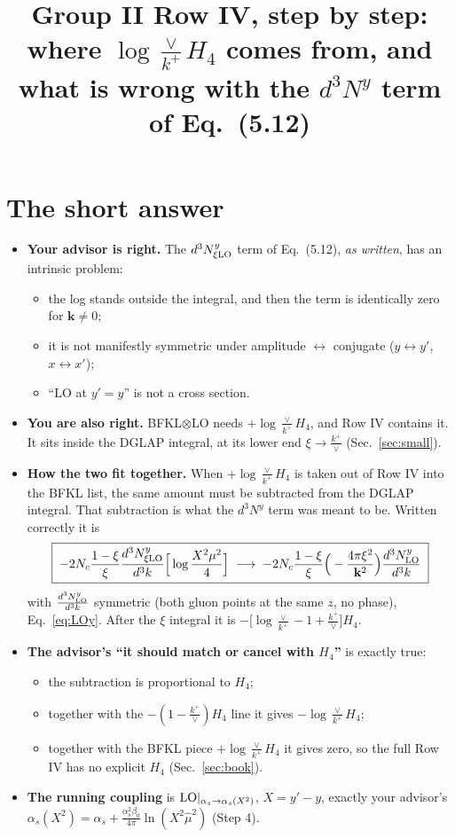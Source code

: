 \documentclass[10pt]{article}
\title{Group II Row IV, step by step:\\ where $\log\frac{\vee}{k^+}H_4$ comes from, and what is wrong with the $d^3N^y$ term of Eq.~(5.12)}
\date{}
\numberwithin{equation}{section}
\newcommand{\LO}{{\rm LO}}
\begin{document}
\maketitle

\section{The short answer}
\begin{itemize}
\item \textbf{Your advisor is right.} The $d^3N^y_{\xi\rm LO}$ term of Eq.~(5.12), \emph{as written}, has an intrinsic problem:
\begin{itemize}
\item the log stands outside the integral, and then the term is identically zero for $\mathbf k\neq0$;
\item it is not manifestly symmetric under amplitude $\leftrightarrow$ conjugate ($y\leftrightarrow y'$, $x\leftrightarrow x'$);
\item ``LO at $y'=y$'' is not a cross section.
\end{itemize}
\item \textbf{You are also right.} BFKL$\otimes$LO needs $+\log\frac{\vee}{k^+}H_4$, and Row IV contains it. It sits inside the DGLAP integral, at its lower end $\xi\to\frac{k^+}{\vee}$ (Sec.~\ref{sec:small}).
\item \textbf{How the two fit together.} When $+\log\frac{\vee}{k^+}H_4$ is taken out of Row IV into the BFKL list, the same amount must be subtracted from the DGLAP integral. That subtraction is what the $d^3N^y$ term was meant to be. Written correctly it is
\begin{equation}
\boxed{\;-2N_c\frac{1-\xi}{\xi}\frac{d^3N^y_{\xi\rm LO}}{d^3k}\Big[\log\frac{X^2\mu^2}{4}\Big]\;\longrightarrow\;-2N_c\frac{1-\xi}{\xi}\Big(-\frac{4\pi\xi^2}{\mathbf k^2}\Big)\frac{d^3N^y_{\rm LO}}{d^3k}\;}\label{eq:repl}
\end{equation}
with $\frac{d^3N^y_{\rm LO}}{d^3k}$ symmetric (both gluon points at the same $z$, no phase), Eq.~\eqref{eq:LOy}. After the $\xi$ integral it is $-\big[\log\frac{\vee}{k^+}-1+\frac{k^+}{\vee}\big]H_4$.
\item \textbf{The advisor's ``it should match or cancel with $H_4$''} is exactly true:
\begin{itemize}
\item the subtraction is proportional to $H_4$;
\item together with the $-(1-\frac{k^+}{\vee})H_4$ line it gives $-\log\frac{\vee}{k^+}H_4$;
\item together with the BFKL piece $+\log\frac{\vee}{k^+}H_4$ it gives zero, so the full Row IV has no explicit $H_4$ (Sec.~\ref{sec:book}).
\end{itemize}
\item \textbf{The running coupling} is $\LO|_{\alpha_s\to\alpha_s(X^2)}$, $X=y'-y$, exactly your advisor's $\alpha_s(X^2)=\alpha_s+\frac{\alpha_s^2\beta_0}{4\pi}\ln(X^2\hat\mu^2)$ (Step 4).
\end{itemize}
\end{document}
